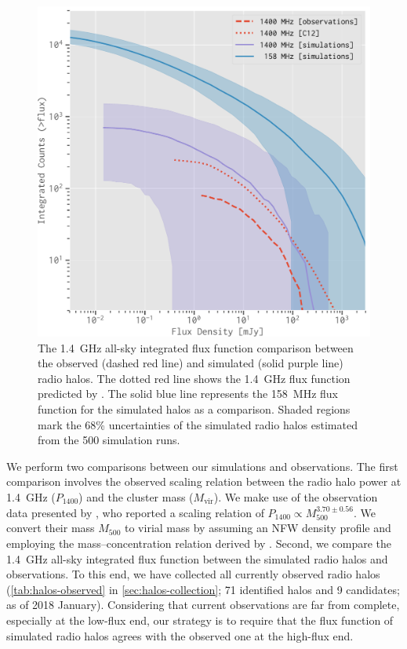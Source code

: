 \documentclass[twocolumn]{aastex62}
\newcommand{\R}[1]{\mathrm{#1}}
\begin{document}
\begin{figure}
  \centering
  \includegraphics[width=\columnwidth]{fluxfunc-simucomp}
  \caption{\label{fig:halos-simucomp}%
    The \SI{1.4}{\GHz} all-sky integrated flux function comparison
    between the observed (dashed red line) and simulated
    (solid purple line) radio halos.
    The dotted red line shows the \SI{1.4}{\GHz} flux function
    predicted by \citet{cassano2012}.
    The solid blue line represents the \SI{158}{\MHz} flux function for
    the simulated halos as a comparison.
    Shaded regions mark the 68\% uncertainties of the
    simulated radio halos estimated from the 500 simulation runs.
  }
\end{figure}

We perform two comparisons between our simulations and observations.
The first comparison involves the observed scaling relation between the
radio halo power at \SI{1.4}{\GHz} ($P_{1400}$) and the cluster mass
($M_{\R{vir}}$).
We make use of the observation data presented by \citet{cassano2013},
who reported a scaling relation of
$P_{1400} \propto M_{500}^{3.70 \pm 0.56}$.
We convert their mass $M_{500}$ to virial mass by assuming an NFW density
profile \citep{navarro1997} and employing the mass--concentration relation
derived by \citet{duffy2008}.
Second, we compare the \SI{1.4}{\GHz} all-sky integrated flux function
between the simulated radio halos and observations.
To this end, we have collected all currently observed radio halos
(\autoref{tab:halos-observed} in \autoref{sec:halos-collection};
71 identified halos and 9 candidates; as of 2018 January).
Considering that current observations are far from complete,
especially at the low-flux end, our strategy is to require that the
flux function of simulated radio halos agrees with the
observed one at the high-flux end.
\end{document}
